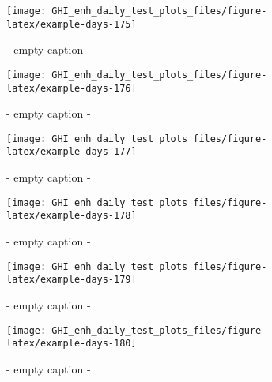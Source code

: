 \documentclass[
  10pt,
  a4paper,oneside]{article}
\begin{document}
\begin{figure}[H]

{\centering \texttt{[image: GHI\_enh\_daily\_test\_plots\_files/figure-latex/example-days-175]} 

}

\caption{ - empty caption - }\label{fig:example-days-175}
\end{figure}

\begin{figure}[H]

{\centering \texttt{[image: GHI\_enh\_daily\_test\_plots\_files/figure-latex/example-days-176]} 

}

\caption{ - empty caption - }\label{fig:example-days-176}
\end{figure}

\begin{figure}[H]

{\centering \texttt{[image: GHI\_enh\_daily\_test\_plots\_files/figure-latex/example-days-177]} 

}

\caption{ - empty caption - }\label{fig:example-days-177}
\end{figure}

\begin{figure}[H]

{\centering \texttt{[image: GHI\_enh\_daily\_test\_plots\_files/figure-latex/example-days-178]} 

}

\caption{ - empty caption - }\label{fig:example-days-178}
\end{figure}

\begin{figure}[H]

{\centering \texttt{[image: GHI\_enh\_daily\_test\_plots\_files/figure-latex/example-days-179]} 

}

\caption{ - empty caption - }\label{fig:example-days-179}
\end{figure}

\begin{figure}[H]

{\centering \texttt{[image: GHI\_enh\_daily\_test\_plots\_files/figure-latex/example-days-180]} 

}

\caption{ - empty caption - }\label{fig:example-days-180}
\end{figure}
\end{document}

